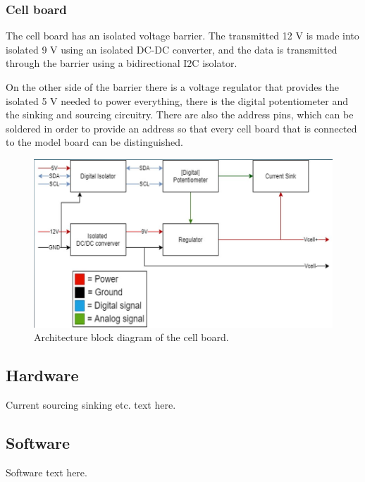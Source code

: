     \subsubsection{Cell board}
    The cell board has an isolated voltage barrier. The transmitted 12 V is 
    made into isolated 9 V using an isolated DC-DC converter, and the data is
    transmitted through the barrier using a bidirectional I2C isolator.

    On the other side of the barrier there is a voltage regulator that provides 
    the isolated 5 V needed to power everything, there is the digital potentiometer
    and the sinking and sourcing circuitry. There are also the address pins, which
    can be soldered in order to provide an address so that every cell board that 
    is connected to the model board can be distinguished. 

    \begin{figure}[h]
        \centering
        \includegraphics[scale=0.47]{architecture_single_cell.png}
        \caption{Architecture block diagram of the cell board.}
    \end{figure}

\subsection{Hardware}
Current sourcing sinking etc. text here.

\subsection{Software}
Software text here.

